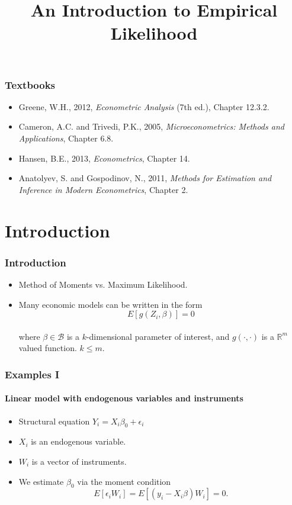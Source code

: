 \documentclass{beamer}
\begin{document}
\title[Empirical Likelihood]{An Introduction to Empirical Likelihood}
\date{}

\maketitle


\begin{frame}
\frametitle{Textbooks}
\begin{itemize}
\item Greene, W.H., 2012, \emph{Econometric Analysis} (7th ed.), Chapter 12.3.2.
\item Cameron, A.C. and Trivedi, P.K., 2005, \emph{Microeconometrics: Methods and Applications}, Chapter 6.8.
\item Hansen, B.E., 2013, \emph{Econometrics}, Chapter 14.
\item Anatolyev, S. and Gospodinov, N., 2011, \emph{Methods for Estimation and Inference in Modern Econometrics}, Chapter 2.
\end{itemize}
\end{frame}

\section{Introduction}
\frame{\sectionpage}


\begin{frame}
\frametitle{Introduction}

\begin{itemize}
\item Method of Moments vs. Maximum Likelihood. \pause
\item Many economic models can be written in the form\\
\[E[g(Z_i, \beta)]=0\] \\where \(\beta\in\mathcal{B}\) is a
$k$-dimensional parameter of  interest, and $g(\cdot,\cdot)$
is a $\mathbb{R}^m$ valued function. \(k\leq m\).
\end{itemize}
\end{frame}





\begin{frame}
\frametitle{Examples I}
\framesubtitle{Linear model with endogenous variables and instruments}
\begin{itemize}
\item 
Structural equation \( Y_i = X_i \beta_0 + \epsilon_i \)
\item \(X_i\) is an endogenous variable. 
\item \(W_i\) is a vector of instruments. \pause
\item We estimate \(\beta_0\) via the moment condition
\[
E \left[ \epsilon_i W_i \right] = 
E \left[ (y_i-X_i\beta) W_i \right] = 0.
\] 
\end{itemize}
\end{frame}
\end{document}
